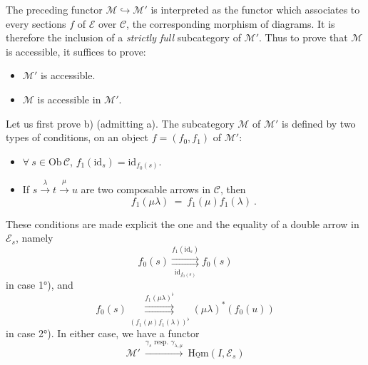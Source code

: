 \documentclass[11pt]{article}
\newcommand{\msp}[1]{\marginpar{\footnotesize [#1]}}
\newcommand{\uHom}{\underline{\mathrm{Hom}}}
\newcommand{\Ob}{\mathrm{Ob}\,}
\newcommand{\id}{\mathrm{id}}
\begin{document}
\msp{page 404}
The preceding functor $\mathcal{M} \hookrightarrow \mathcal{M}'$ is interpreted as the functor which associates to every sections $f$ of $\mathcal{E}$ over $\mathcal{C}$, the corresponding morphism of diagrams. It is therefore the inclusion of a \textit{strictly full} subcategory of $\mathcal{M}'$. Thus to prove that $\mathcal{M}$ is accessible, it suffices to prove: %
\begin{itemize}[leftmargin=2.5em]
\item[a)] $\mathcal{M}'$ is accessible.
\item[b)] $\mathcal{M}$ is accessible in $\mathcal{M}'$.
\end{itemize}
Let us first prove b) (admitting a). The subcategory $\mathcal{M}$ of $\mathcal{M}'$ is defined by two types of conditions, on an object $f = (f_0,f_1)$ of $\mathcal{M}'$:
\begin{itemize}[leftmargin=2.5em]
\item[1°)] $\forall\ s \in \Ob\mathcal{C}$, $f_1(\id_s) = \id_{f_0(s)}$.
\item[2°)] If $s \xrightarrow{\lambda} t \xrightarrow{\mu} u$ are two composable arrows in $\mathcal{C}$, then
\[
f_1(\mu\lambda) \ = \ f_1(\mu)f_1(\lambda) \ .
\]
\end{itemize}
These conditions are made explicit the one and the equality of a double arrow in $\mathcal{E}_s$,
\msp{page 405}
namely
\[
f_0(s) \overset{f_1(\id_s)}{\underset{\id_{f_0(s)}}{\rightrightarrows}} f_0(s)
\]
in case 1°), and
\[
f_0(s) \overset{f_1(\mu\lambda)^\flat}{\underset{(f_1(\mu)f_1(\lambda))^\flat}{\rightrightarrows}} (\mu\lambda)^*(f_0(u))
\]
in case 2°). In either case, we have a functor
\[
\mathcal{M}' \ \xrightarrow{\gamma_s \text{ resp. } \gamma_{\lambda,\mu}} \ \uHom(I,\mathcal{E}_s)
\]
\end{document}
